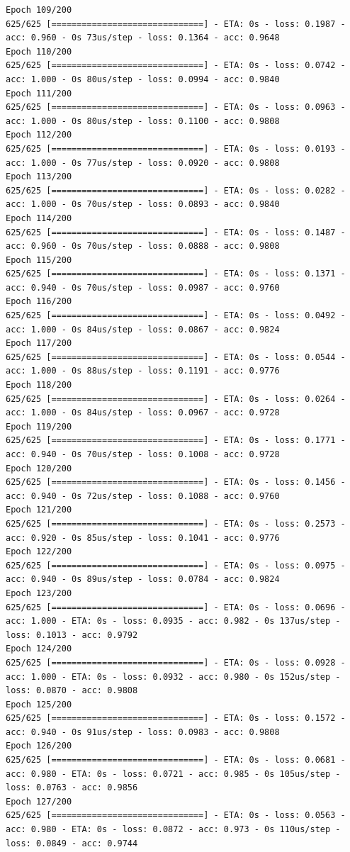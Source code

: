 \documentclass[11pt]{article}
\begin{document}
\begin{Verbatim}[commandchars=\\\{\}]
Epoch 109/200
625/625 [==============================] - ETA: 0s - loss: 0.1987 - acc: 0.960 - 0s 73us/step - loss: 0.1364 - acc: 0.9648
Epoch 110/200
625/625 [==============================] - ETA: 0s - loss: 0.0742 - acc: 1.000 - 0s 80us/step - loss: 0.0994 - acc: 0.9840
Epoch 111/200
625/625 [==============================] - ETA: 0s - loss: 0.0963 - acc: 1.000 - 0s 80us/step - loss: 0.1100 - acc: 0.9808
Epoch 112/200
625/625 [==============================] - ETA: 0s - loss: 0.0193 - acc: 1.000 - 0s 77us/step - loss: 0.0920 - acc: 0.9808
Epoch 113/200
625/625 [==============================] - ETA: 0s - loss: 0.0282 - acc: 1.000 - 0s 70us/step - loss: 0.0893 - acc: 0.9840
Epoch 114/200
625/625 [==============================] - ETA: 0s - loss: 0.1487 - acc: 0.960 - 0s 70us/step - loss: 0.0888 - acc: 0.9808
Epoch 115/200
625/625 [==============================] - ETA: 0s - loss: 0.1371 - acc: 0.940 - 0s 70us/step - loss: 0.0987 - acc: 0.9760
Epoch 116/200
625/625 [==============================] - ETA: 0s - loss: 0.0492 - acc: 1.000 - 0s 84us/step - loss: 0.0867 - acc: 0.9824
Epoch 117/200
625/625 [==============================] - ETA: 0s - loss: 0.0544 - acc: 1.000 - 0s 88us/step - loss: 0.1191 - acc: 0.9776
Epoch 118/200
625/625 [==============================] - ETA: 0s - loss: 0.0264 - acc: 1.000 - 0s 84us/step - loss: 0.0967 - acc: 0.9728
Epoch 119/200
625/625 [==============================] - ETA: 0s - loss: 0.1771 - acc: 0.940 - 0s 70us/step - loss: 0.1008 - acc: 0.9728
Epoch 120/200
625/625 [==============================] - ETA: 0s - loss: 0.1456 - acc: 0.940 - 0s 72us/step - loss: 0.1088 - acc: 0.9760
Epoch 121/200
625/625 [==============================] - ETA: 0s - loss: 0.2573 - acc: 0.920 - 0s 85us/step - loss: 0.1041 - acc: 0.9776
Epoch 122/200
625/625 [==============================] - ETA: 0s - loss: 0.0975 - acc: 0.940 - 0s 89us/step - loss: 0.0784 - acc: 0.9824
Epoch 123/200
625/625 [==============================] - ETA: 0s - loss: 0.0696 - acc: 1.000 - ETA: 0s - loss: 0.0935 - acc: 0.982 - 0s 137us/step - loss: 0.1013 - acc: 0.9792
Epoch 124/200
625/625 [==============================] - ETA: 0s - loss: 0.0928 - acc: 1.000 - ETA: 0s - loss: 0.0932 - acc: 0.980 - 0s 152us/step - loss: 0.0870 - acc: 0.9808
Epoch 125/200
625/625 [==============================] - ETA: 0s - loss: 0.1572 - acc: 0.940 - 0s 91us/step - loss: 0.0983 - acc: 0.9808
Epoch 126/200
625/625 [==============================] - ETA: 0s - loss: 0.0681 - acc: 0.980 - ETA: 0s - loss: 0.0721 - acc: 0.985 - 0s 105us/step - loss: 0.0763 - acc: 0.9856
Epoch 127/200
625/625 [==============================] - ETA: 0s - loss: 0.0563 - acc: 0.980 - ETA: 0s - loss: 0.0872 - acc: 0.973 - 0s 110us/step - loss: 0.0849 - acc: 0.9744

\end{Verbatim}
\end{document}
